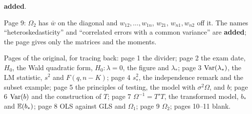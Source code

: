 \documentclass[11pt]{article}
\begin{document}
\begin{transcriptnotes}
        \textbf{added}.
  \item Page 9: $\Omega_{2}$ has $\bar w$ on the diagonal and $w_{12}, \ldots, w_{1n}$,
        $w_{21}$, $w_{n1}, w_{n2}$ off it. The names ``heteroskedasticity'' and
        ``correlated errors with a common variance'' are \textbf{added}; the page
        gives only the matrices and the moments.
  \item Pages of the original, for tracing back: page 1 the divider; page 2 the exam
        date, $H_{0}$, the Wald quadratic form, $H_{0} : \lambda = 0$, the figure and
        $\lambda_{*}$; page 3 $\operatorname{Var}(\lambda_{*})$, the LM statistic, $s^{2}$ and
        $F(q, n-K)$; page 4 $s_{*}^{2}$, the independence remark and the subset
        example; page 5 the principles of testing, the model with $\sigma^{2}\Omega$,
        and $b$; page 6 $\operatorname{Var}(b)$ and the construction of $T$; page 7 $\Omega^{-1} =
        T'T$, the transformed model, $b_{*}$ and $\mathbb{E}(b_{*})$; page 8 OLS against
        GLS and $\Omega_{1}$; page 9 $\Omega_{2}$; pages 10--11 blank.
\end{transcriptnotes}
\end{document}
